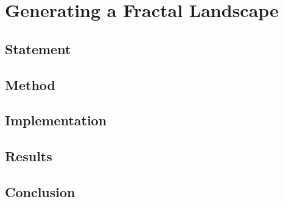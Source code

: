 \section{Generating a Fractal Landscape}

\subsection{Statement}
\subsection{Method}
\subsection{Implementation}
\subsection{Results}
\subsection{Conclusion}
